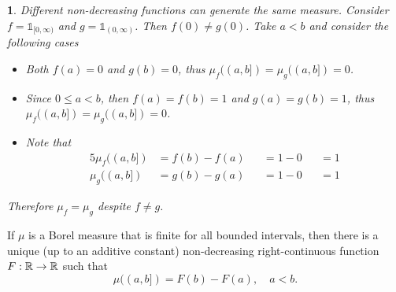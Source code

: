 \documentclass{eeleyes}
\begin{document}

\newtheorem{com}{{\color{blue} Comment}}[section]
\newtheorem{que}{{\color{blue} Question}}[section]
\newtheorem*{ans}{{\color{orange}\em Answer}}
\newtheorem*{rem}{{\color{magenta}{\em Remark}}}
\newtheorem*{hint}{{\color{brown}{\em Hint}}}

\pagestyle{fancy}



\begin{rem}
    \newcommand{\ind}[1]{\mathds{1}_{#1}}
    Different non-decreasing functions can generate the same measure. Consider $f = \ind{[0,\infty)}$ and $g = \ind{(0,\infty)}$. Then $f(0) \neq g(0)$. Take $a < b$ and consider the following cases
    \begin{itemize}
        \item[$a,b \leq 0)$]
            Both $f(a) = 0$ and $g(b) = 0$, thus $\mu_f((a,b]) = \mu_g((a,b]) = 0$.

        \item[$a,b \geq 0)$]
            Since $0 \leq a < b$, then $f(a) = f(b) = 1$ and $g(a) = g(b) = 1$, thus $\mu_f((a,b]) = \mu_g((a,b]) = 0$.

        \item[$a < 0 < b)$]
            Note that
            \begin{alignat*}{5}
                \mu_f((a,b]) &= f(b) - f(a) &&= 1 - 0 &&= 1 \\
                \mu_g((a,b]) &= g(b) - g(a) &&= 1 - 0 &&= 1
            \end{alignat*}
    \end{itemize}
    Therefore $\mu_f = \mu_g$ despite $f \neq g$. 
\end{rem}

\begin{theorem}
    If $\mu$ is a Borel measure that is finite for all bounded intervals, then there is a unique (up to an additive constant) non-decreasing right-continuous function $F : \mathbb{R} \to \mathbb{R}$ such that
    \[
        \mu((a,b]) = F(b) - F(a), \quad a < b
    .\]
\end{theorem}
\end{document}
